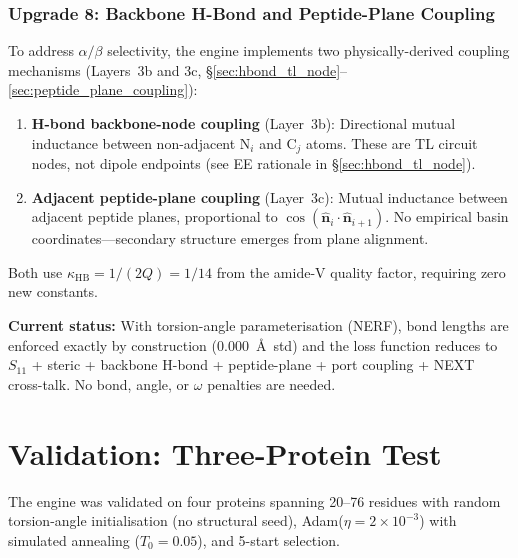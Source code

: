 \subsubsection{Upgrade 8: Backbone H-Bond and Peptide-Plane Coupling}

To address $\alpha/\beta$ selectivity, the engine implements two physically-derived coupling mechanisms (Layers~3b and 3c, \S\ref{sec:hbond_tl_node}--\ref{sec:peptide_plane_coupling}):

\begin{enumerate}
    \item \textbf{H-bond backbone-node coupling} (Layer~3b): Directional mutual inductance between non-adjacent N$_i$ and C$_j$ atoms.  These are TL circuit nodes, not dipole endpoints (see EE rationale in \S\ref{sec:hbond_tl_node}).
    \item \textbf{Adjacent peptide-plane coupling} (Layer~3c): Mutual inductance between adjacent peptide planes, proportional to $\cos(\hat{\mathbf{n}}_i \cdot \hat{\mathbf{n}}_{i+1})$.  No empirical basin coordinates---secondary structure emerges from plane alignment.
\end{enumerate}

Both use $\kappa_\text{HB} = 1/(2Q) = 1/14$ from the amide-V quality factor, requiring zero new constants.

\textbf{Current status:} With torsion-angle parameterisation (NERF), bond lengths are enforced exactly by construction (0.000~\AA\ std) and the loss function reduces to $S_{11}$ + steric + backbone H-bond + peptide-plane + port coupling + NEXT cross-talk.  No bond, angle, or $\omega$ penalties are needed.

\section{Validation: Three-Protein Test}
\label{sec:validation_three_protein}

The engine was validated on four proteins spanning 20--76 residues with random torsion-angle initialisation (no structural seed), Adam($\eta = 2 \times 10^{-3}$) with simulated annealing ($T_0 = 0.05$), and 5-start selection.


